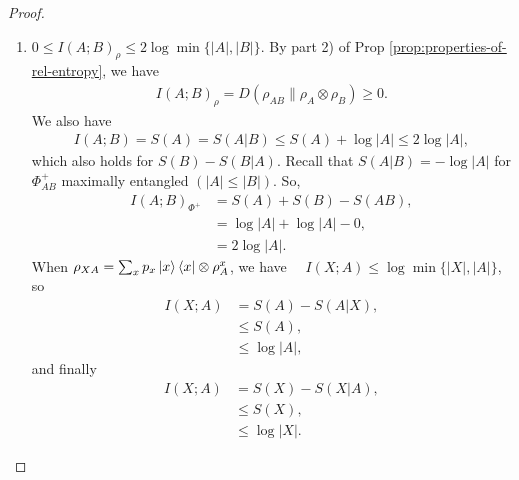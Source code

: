 \documentclass[notoc]{tufte-book}
\begin{document}
\begin{proof}
\begin{enumerate}
    \item $0 \leq I(A;B)_{\rho} \leq 2\log{\min{\{|A|,|B|\}}}$. By part 2) of Prop \ref{prop:properties-of-rel-entropy}, we have 
    \begin{align}
        I(A;B)_{\rho} = D(\rho_{AB}\| \rho_A \otimes \rho_B) \geq 0.
    \end{align}
    We also have
    \begin{align}
        I(A;B) = S(A)=S(A|B) \leq S(A) + \log{|A|} \leq 2\log{|A|},
    \end{align}
    which also holds for $S(B)-S(B|A)$. Recall that $S(A|B) = -\log{|A|}$ for $\Phi_{AB}^+$ maximally entangled $(|A|\leq|B|)$. So, \begin{align}
        I(A;B)_{\Phi^+} &= S(A)+S(B)-S(AB),\\
        &=\log{|A|}+\log{|A|} - 0,\\
        &=2\log{|A|}.
    \end{align}
    When $\rho_{XA}=\sum_x p_x \ket{x}\bra{x} \otimes \rho_A^x$, we have $\quad I(X;A) \leq \log{\min{\{|X|,|A|\}}}$, so
    \begin{align}
        I(X;A) &= S(A)-S(A|X),\\
        &\leq S(A),\\
        &\leq \log{|A|},
    \end{align}
    and finally
    \begin{align}
        I(X;A) &= S(X)-S(X|A),\\
        &\leq S(X),\\
        &\leq \log{|X|}.
    \end{align}
    

\end{enumerate}
\end{proof}
\end{document}
